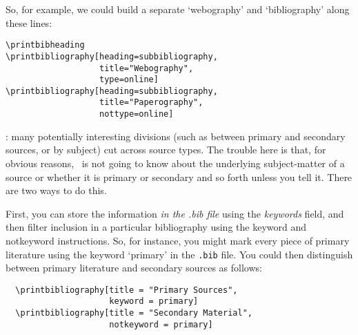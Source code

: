 So, for example, we could build a separate `webography' and
`bibliography' along these lines:

\begin{Verbatim}
\printbibheading
\printbibliography[heading=subbibliography,
                   title="Webography",
                   type=online]
\printbibliography[heading=subbibliography,
                   title="Paperography",
                   nottype=online]
\end{Verbatim}

: many
potentially interesting divisions (such as between primary and
secondary sources, or by subject) cut across source types. The trouble
here is that, for obvious reasons, \biblatex\ is not going to know
about the underlying subject-matter of a source or whether it is
primary or secondary and so forth unless you tell it. There are two
ways to do this.

First, you can store the information \emph{in the .bib file} using the
  \emph{keywords} field, and then filter inclusion in a particular
  bibliography using the keyword and notkeyword instructions. So, for
  instance, you might mark every piece of primary literature using the
  keyword `primary' in the \texttt{.bib} file. You could then
  distinguish between primary literature and secondary sources as
  follows:
\begin{Verbatim}
  \printbibliography[title = "Primary Sources",
                     keyword = primary]
  \printbibliography[title = "Secondary Material",
                     notkeyword = primary]
\end{Verbatim}

